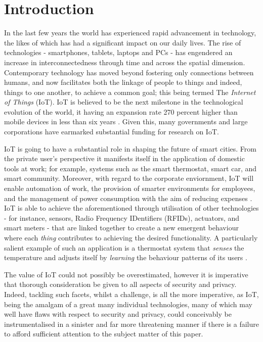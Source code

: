 \documentclass{llncs}
\begin{document}
\section{Introduction}
In the last few years the world has experienced rapid advancement in technology, the likes of which has had a significant impact on our daily lives. The rise of technologies - smartphones, tablets, laptops and PCs - has engendered an increase in interconnectedness through time and across the spatial dimension. Contemporary technology has moved beyond fostering only connections between humans, and now facilitates both the linkage of people to things and indeed, things to one another, to achieve a common goal; this being termed The \textit{Internet of Things} (IoT). IoT is believed to be the next milestone in the technological evolution of the world, it having an expansion rate 270 percent higher than mobile devices in less than six years \cite{Yves2014}. Given this, many governments and large corporations have earmarked substantial funding for research on IoT.

IoT is going to have a substantial role in shaping the future of smart cities. From the private user's perspective it manifests itself in the application of domestic tools at work; for example, systems such as the smart thermostat, smart car, and smart community. Moreover, with regard to the corporate enviornment, IoT will enable automation of work, the provision of smarter environments for employees, and the management of power consumption with the aim of reducing expenses \cite{Buckl2009}. IoT is able to achieve the aforementioned through utilisation of other technologies \cite{Kortuem2010,Serbanati2011} - for instance, sensors, Radio Frequency IDentifiers (RFIDs), actuators, and smart meters - that are linked together to create a new emergent behaviour where each \textit{thing} contributes to achieving the desired functionality. A particularly salient example of such an application is a thermostat system that \textit{senses} the temperature and adjusts itself by \textit{learning} the behaviour patterns of its users \cite{Nest2014}.

The value of IoT could not possibly be overestimated, however it is imperative that thorough consideration be given to all aspects of security and privacy. Indeed, tackling such facets, whilst a challenge, is all the more imperative, as IoT, being the amalgam of a great many individual technologies, many of which may well have flaws with respect to security and privacy, could conceivably be instrumentalised in a sinister and far more threatening manner if there is a failure to afford sufficient attention to the subject matter of this paper.  
\end{document}

